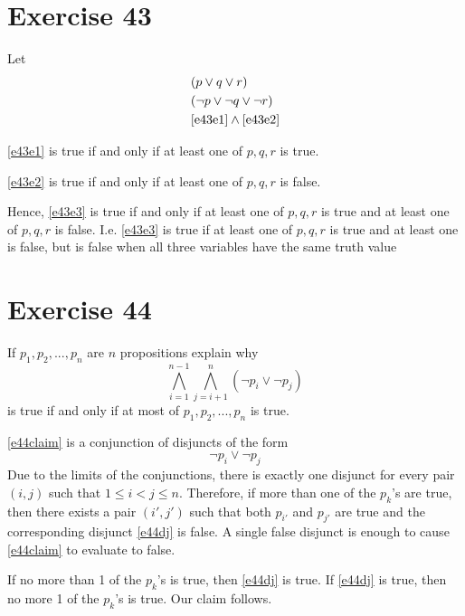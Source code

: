 \documentclass{article}
\begin{document}
\pagebreak

\section{Exercise 43}
Let
\begin{align}
	 & (p \lor q \lor r) \label{e43e1}                 \\
	 & (\neg p \lor \neg q \lor \neg r) \label{e43e2}  \\
	 & \eqref{e43e1} \land \eqref{e43e2} \label{e43e3}
\end{align}

\eqref{e43e1} is true if and only if at least one of $p, q, r$ is true.

\eqref{e43e2} is true if and only if at least one of $p, q, r$ is false.

Hence, \eqref{e43e3} is true if and only if at least one of $p, q, r$ is true and at least one of $p, q, r$ is false.  I.e. \eqref{e43e3} is true if at least one of $p, q, r$ is true and at least one is false, but is false when all three variables have the same truth value


\pagebreak

\section{Exercise 44}
If $p_1, p_2, ..., p_n$ are $n$ propositions explain why
\begin{equation}\label{e44claim}
	\bigwedge_{i=1}^{n-1} \bigwedge_{j=i+1}^n (\neg p_i \lor \neg p_j)
\end{equation}
is true if and only if at most of $p_1, p_2, ..., p_n$ is true.

\eqref{e44claim} is a conjunction of disjuncts of the form
\begin{equation}\label{e44dj}
	\neg p_i \lor \neg p_j
\end{equation}
Due to the limits of the conjunctions, there is exactly one disjunct for every pair $(i,j)$ such that $1 \le i < j \le n$.  Therefore, if more than one of the $p_k$'s are true, then there exists a pair $(i',j')$ such that both $p_{i'}$ and $p_{j'}$ are true and the corresponding disjunct \eqref{e44dj} is false.  A single false disjunct is enough to cause \eqref{e44claim} to evaluate to false.

If no more than 1 of the $p_k$'s is true, then \eqref{e44dj} is true.  If \eqref{e44dj} is true, then no more 1 of the $p_k$'s is true. Our claim follows.
\end{document}
